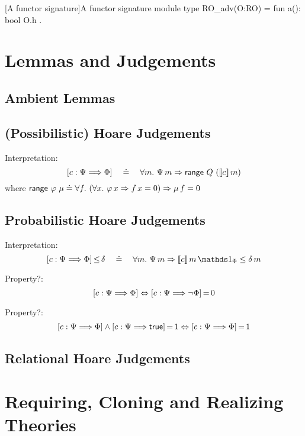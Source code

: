 \begin{easycrypt}[label={lst:functorsig}]{[A functor signature]A functor signature}
module type RO_adv(O:RO) = {
  fun a(): bool { O.h }
}.
\end{easycrypt}

\section{Lemmas and Judgements}

\subsection{Ambient Lemmas}

\subsection{(Possibilistic) Hoare Judgements}

Interpretation:
\begin{displaymath}
\left[{c}:{\Psi}\Longrightarrow{\Phi}\right]
\quad\doteq\quad
\forall m.~ \Psi\,m \Rightarrow \mathsf{range}~{Q}~{(}[\![ c ]\!]\,m)
\end{displaymath}
%
where $\mathsf{range}~{\varphi}~{\mu} \doteq \forall f.~ (\forall x.~ \varphi\,x
\Rightarrow f\,x=0) \Rightarrow \mu\,f=0$




\subsection{Probabilistic Hoare Judgements}

Interpretation:
\begin{displaymath}
\bdHoareSle{c}{\pre}{\post}{\delta} 
\quad\doteq\quad
\forall m.~ \pre\,m \Rightarrow [\![ c ]\!]\,m\,\charfun_\post \leq
\delta\,m
\end{displaymath}

Property?:
\begin{displaymath}
\left[{c}:{\Psi}\Longrightarrow{\Phi}\right]
\Leftrightarrow
{\left[{c}:{\Psi}\Longrightarrow{\neg\Phi}\right]}\,{=}\,{0}
\end{displaymath}

Property?:
\begin{displaymath}
\left[{c}:{\Psi}\Longrightarrow{\Phi}\right] \land {\left[{c}:{\Psi}\Longrightarrow{\mathsf{true}}\right]}\,{=}\,{1}
\Leftrightarrow
{\left[{c}:{\Psi}\Longrightarrow{\Phi}\right]}\,{=}\,{1}
\end{displaymath}


\subsection{Relational Hoare Judgements}

\section{Requiring, Cloning and Realizing Theories\label{sec:cloning}}






